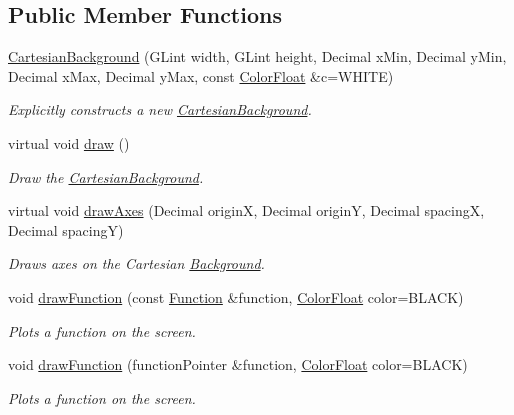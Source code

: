 \subsection*{Public Member Functions}
\begin{DoxyCompactItemize}
\item 
\hyperlink{classtsgl_1_1_cartesian_background_aff44104863ff24b333e599e03a837318}{Cartesian\+Background} (G\+Lint width, G\+Lint height, Decimal x\+Min, Decimal y\+Min, Decimal x\+Max, Decimal y\+Max, const \hyperlink{structtsgl_1_1_color_float}{Color\+Float} \&c=W\+H\+I\+TE)
\begin{DoxyCompactList}\small\item\em Explicitly constructs a new \hyperlink{classtsgl_1_1_cartesian_background}{Cartesian\+Background}. \end{DoxyCompactList}\item 
virtual void \hyperlink{classtsgl_1_1_cartesian_background_a4cdb6866a066e6647af9dbdae738b9b2}{draw} ()
\begin{DoxyCompactList}\small\item\em Draw the \hyperlink{classtsgl_1_1_cartesian_background}{Cartesian\+Background}. \end{DoxyCompactList}\item 
virtual void \hyperlink{classtsgl_1_1_cartesian_background_ad6b87579d02c1ed138d7ace809e705a8}{draw\+Axes} (Decimal originX, Decimal originY, Decimal spacingX, Decimal spacingY)
\begin{DoxyCompactList}\small\item\em Draws axes on the Cartesian \hyperlink{classtsgl_1_1_background}{Background}. \end{DoxyCompactList}\item 
void \hyperlink{classtsgl_1_1_cartesian_background_ae494eed2e3277ddc0506d382054f22c3}{draw\+Function} (const \hyperlink{classtsgl_1_1_function}{Function} \&function, \hyperlink{structtsgl_1_1_color_float}{Color\+Float} color=B\+L\+A\+CK)
\begin{DoxyCompactList}\small\item\em Plots a function on the screen. \end{DoxyCompactList}\item 
void \hyperlink{classtsgl_1_1_cartesian_background_a8c7be40429c42d0e4504eeb6b0057a95}{draw\+Function} (function\+Pointer \&function, \hyperlink{structtsgl_1_1_color_float}{Color\+Float} color=B\+L\+A\+CK)
\begin{DoxyCompactList}\small\item\em Plots a function on the screen. \end{DoxyCompactList}\item 

\end{DoxyCompactItemize}
